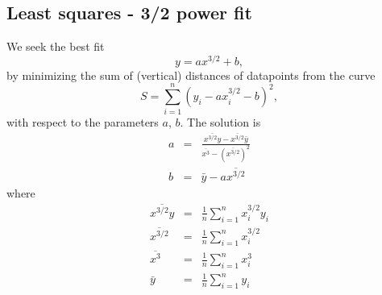 \subsection{Least squares - 3/2 power fit}\label{ls:fit32}
We seek the best fit 
\begin{equation}
 y = ax^{3/2}+b,
\end{equation}
by minimizing the sum of (vertical) distances of datapoints from the curve 
\begin{equation*}
 S = \sum_{i=1}^n (y_i - a x_i^{3/2}-b)^2,
\end{equation*} 
with respect to the parameters $a$, $b$.
The solution is 
\begin{eqnarray}
 a &=& \frac{\overline{x^{3/2}y}  - \overline{x^{3/2}} \bar y}{\overline{x^3} - \left( \overline{x^{3/2}} \right)^2} \\
 b &=& \bar y -a \overline{x^{3/2}}
\end{eqnarray}
where
\begin{eqnarray}
 \overline{x^{3/2}y} &=& \frac1n\sum_{i=1}^n x_i^{3/2}y_i \\
 \overline{x^{3/2}} &=& \frac1n\sum_{i=1}^n x_i^{3/2} \\
 \overline{x^3} &=& \frac1n\sum_{i=1}^n x_i^3 \\
 \bar y &=& \frac1n \sum_{i=1}^n y_i
\end{eqnarray}